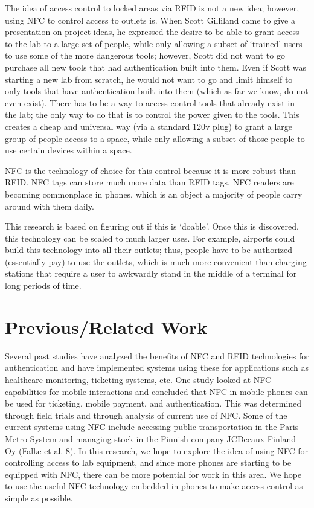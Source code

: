 \documentclass{sigchi}
\begin{document}
The idea of access control to locked areas via RFID is not a new idea; however, using NFC to control access to outlets is. When Scott Gilliland came to give a presentation on project ideas, he expressed the desire to be able to grant access to the lab to a large set of people, while only allowing a subset of ‘trained’ users to use some of the more dangerous tools; however, Scott did not want to go purchase all new tools that had authentication built into them. Even if Scott was starting a new lab from scratch, he would not want to go and limit himself to only tools that have authentication built into them (which as far we know, do not even exist). There has to be a way to access control tools that already exist in the lab; the only way to do that is to control the power given to the tools. This creates a cheap and universal way (via a standard 120v plug) to grant a large group of people access to a space, while only allowing a subset of those people to use certain devices within a space. 

NFC is the technology of choice for this control because it is more robust than RFID. NFC tags can store much more data than RFID  tags. NFC readers are becoming commonplace in phones, which is an object a majority of people carry around with them daily.

This research is based on figuring out if this is ‘doable’. Once this is discovered, this technology can be scaled to much larger uses. For example, airports could build this technology into all their outlets; thus, people have to be authorized (essentially pay) to use the outlets, which is much more convenient than charging stations that require a user to awkwardly stand in the middle of a terminal for long periods of time. 

\section{Previous/Related Work}

Several past studies have analyzed the benefits of NFC and RFID technologies for authentication and have implemented systems using these for applications such as healthcare monitoring, ticketing systems, etc. One study looked at NFC capabilities for mobile interactions and concluded that NFC in mobile phones can be used for ticketing, mobile payment, and authentication. This was determined through field trials and through analysis of current use of NFC. Some of the current systems using NFC include accessing public transportation in the Paris Metro System and managing stock in the Finnish company JCDecaux Finland Oy (Falke et al. 8). In this research, we hope to explore the idea of using NFC for controlling access to lab equipment, and since more phones are starting to be equipped with NFC, there can be more potential for work in this area. We hope to use the useful NFC technology embedded in phones to make access control as simple as possible.
\end{document}
